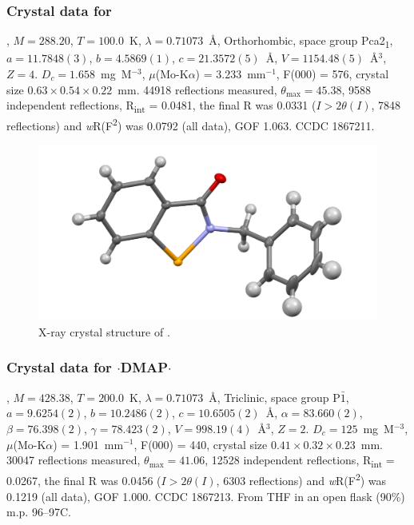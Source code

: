 \begin{refsection}
\subsubsection{Crystal data for \texorpdfstring{}{C14H11NOSe}}
, $M=288.20$, $T=100.0$~K, $ \lambda=0.71073 $~\AA, Orthorhombic, space group Pca2\textsubscript{1}, $a = 11.7848(3)$, $b = 4.5869(1)$, $c = 21.3572(5)$~\AA, $V = 1154.48(5)$~\AA$^{3}$, $Z = 4$.
$D_{c}= 1.658$~mg~M$^{-3}$, $\mu$(Mo-K$\alpha$) = 3.233~mm$^{-1}$, F(000) = 576, crystal size $0.63 \times 0.54 \times 0.22$~mm.
44918 reflections measured, $\theta_{\max}=45.38$\degree, 9588 independent reflections, R\textsubscript{int} = 0.0481, the final R was 0.0331 ($I > 2\theta(I)$, 7848 reflections) and \textit{w}R(F\textsuperscript{2}) was 0.0792 (all data), GOF 1.063.
CCDC 1867211.

\begin{figure}
  \includegraphics[width=0.6\linewidth]{Figures/ebs-bn-xtal.pdf}
  \caption{X-ray crystal structure of \texorpdfstring{}{C14H11NOSe}.}
\end{figure}

\subsubsection{Crystal data for \texorpdfstring{$ \cdot $DMAP$ \cdot $}{C21H21N3OSe.(H2O)}}
, $M=428.38$, $T=200.0$~K, $ \lambda=0.71073 $~\AA, Triclinic, space group P$\bar{1}$, $a = 9.6254(2)$, $b = 10.2486(2)$, $c = 10.6505(2)$~\AA, $\alpha = 83.660(2)$\degree, $\beta = 76.398(2)$\degree, $\gamma = 78.423(2)$\degree, $V = 998.19(4)$~\AA$^{3}$, $Z = 2$.
$D_{c}= 125$~mg~M$^{-3}$, $\mu$(Mo-K$\alpha$) = 1.901~mm$^{-1}$, F(000) = 440, crystal size $0.41 \times 0.32 \times 0.23$~mm.
30047 reflections measured, $\theta_{\max} = 41.06$\degree, 12528 independent reflections, R\textsubscript{int} = 0.0267, the final R was 0.0456 ($I > 2\theta(I)$, 6303 reflections) and \textit{w}R(F\textsuperscript{2}) was 0.1219 (all data), GOF 1.000.
CCDC 1867213.
From THF in an open flask (90\%) m.p. 96--97\degree{}C.


\end{refsection}

